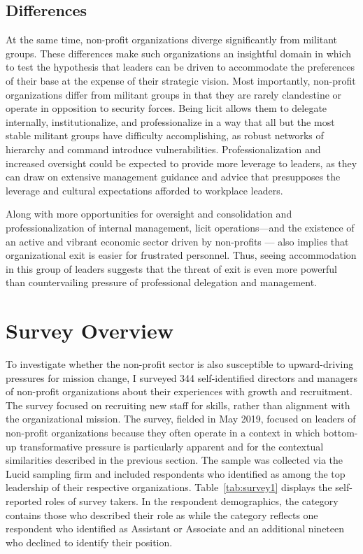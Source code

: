 \subsection{Differences}

At the same time, non-profit organizations diverge significantly from militant groups. These differences make such organizations an insightful domain in which to test the hypothesis that leaders can be driven to accommodate the preferences of their base at the expense of their strategic vision.   Most importantly, non-profit organizations differ from militant groups in that they are rarely clandestine or operate in opposition to security forces. Being licit allows them to delegate internally, institutionalize, and professionalize in a way that all but the most stable militant groups have difficulty accomplishing, as robust networks of hierarchy and command introduce vulnerabilities. Professionalization and increased oversight could be expected to provide more leverage to leaders, as they can draw on extensive management guidance and advice that presupposes the leverage and cultural expectations afforded to workplace leaders.

Along with more opportunities for oversight and consolidation and professionalization of internal management, licit operations---and the existence of an active and vibrant economic sector driven by non-profits --- also implies that organizational exit is easier for frustrated personnel. Thus, seeing accommodation in this group of leaders suggests that the threat of exit is even more powerful than countervailing pressure of professional delegation and management. 

\section{Survey Overview}

To investigate whether the non-profit sector is also susceptible to upward-driving pressures for mission change, I surveyed 344 self-identified directors and managers of non-profit organizations about their experiences with growth and recruitment. The survey focused on recruiting new staff for skills, rather than alignment with the organizational mission. The survey, fielded in May 2019, focused on leaders of non-profit organizations because they often operate in a context in which bottom-up transformative pressure is particularly apparent and for the contextual similarities described in the previous section. The sample was collected via the Lucid sampling firm and included respondents who identified as among the top leadership of their respective organizations. Table~\ref{tab:survey1} displays the self-reported roles of survey takers.  In the respondent demographics, the  category contains those who described their role as  while the  category reflects one respondent who identified as Assistant or Associate and an additional nineteen who declined to identify their position.

